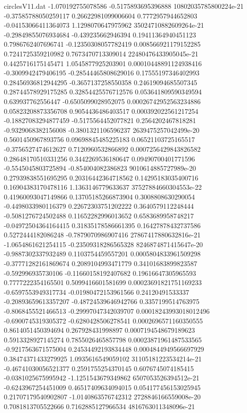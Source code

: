 \begin{filecontents}{circlesV11.dat}
-1.070192755078586	-0.5175893695396888	10802035785800224e-21
-0.37585788050259117	0.26622981099006604	0.7772957944652803
-0.04153066411364073	1.1298070647975962	35024710882609264e-21
-0.29849855076934684	-0.439235662946394	0.19411364940451123
0.7986762407696741	-0.12350308057782419	0.008566921179152285
0.7241725359210982	0.7673470713309014	22480476433905045e-21
0.4425716175145471	1.0545877925203901	0.00010448891124938416
-0.3009942479406195	-0.28544465808629016	0.17555197346402993
0.28456936812944295	-0.3657137258550358	0.24619094685507345
0.28744578929175285	0.32854425576712576	0.053641809590349594
0.639937762556447	-0.6505099028952075	0.00026742952563234886
0.05823208873356708	0.9054436486403517	0.000392022561217254
-0.18827083294877459	-0.5175564452077821	0.2564202467818281
-0.9329068382156008	-0.3801321106596237	2639475257042499e-20
0.5601450967893756	0.09698845485225183	0.06521103725165517
-0.3756527474612627	0.7120960532866892	0.0007256429843826582
0.28648170510331256	0.3442269536180647	0.09490700401771596
-0.5545045803725894	-0.854004082386823	9010614885727989e-20
0.27939838551695295	0.20316442364718562	0.14295183035400716
0.16904383170478116	1.1363146779633637	37527884660304553e-22
0.41960093047149866	0.13705185266873904	0.3008808630290054
-0.4498033980116379	0.22672303751202222	0.3640579112248444
-0.5081276724502488	0.11652282996013652	0.6583689958748217
-0.04972504364164415	0.31835178586661395	0.16427878432737586
0.5272444182086248	-0.7879070986907416	27867417880632816e-21
-1.0654861621254115	-0.23509318286565328	8246874871415647e-20
-0.9887302337932489	0.1103754459557201	0.0005804833961509298
-0.37771282161869674	0.2089104993471779	0.34101683899823587
-0.592996935730106	-0.11660158192407682	0.19616647305965593
0.7777222354165501	0.5099416601581699	0.00023691821751169233
-0.6597553949317734	-0.01980472153961566	0.24120491533337
-0.20893659613357207	-0.48724539646942766	0.3357199514763975
-0.8068455521466513	-0.29997047342039707	0.00018243993018012496
-0.6900745319305372	-0.6280428506278541	0.0002696571160350555
0.8614051450394694	0.267928431998897	0.0007194548679189623
0.5913328927145274	0.7855026465857798	0.00023871961487533565
-0.9217563671575004	0.24534492193834448	0.0004844949566697929
0.38474371433279925	1.0935616549059102	31105181223534214e-21
-0.46741030056521377	0.2591755254370145	0.6076745074185415
-0.0381025675995942	-1.1251543679349862	6507053526394512e-21
-0.6243967254451009	0.46517409634094015	0.054177456153025945
0.21707179540902807	-1.0140863576742312	2728846166559008e-20
0.7081813705522666	0.7162885127966534	4816763011348096e-21

\end{filecontents}
